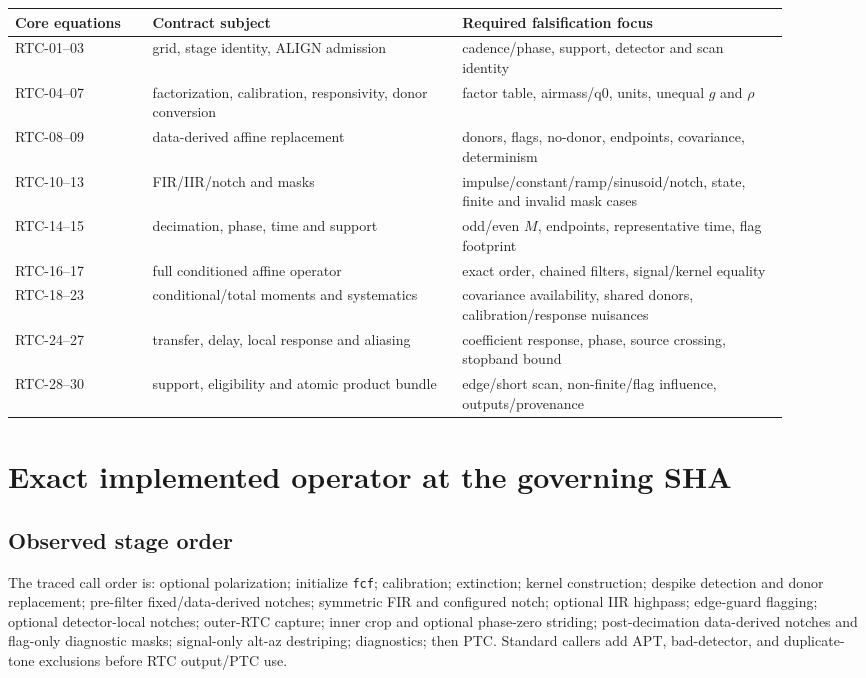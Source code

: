 \documentclass[11pt]{article}
\newcommand{\code}[1]{\nolinkurl{#1}}
\begin{document}
\begin{longtable}{@{}L{0.16\linewidth}L{0.36\linewidth}L{0.38\linewidth}@{}}
\toprule
Core equations & Contract subject & Required falsification focus \\
\midrule
\endhead
RTC-01--03 & grid, stage identity, ALIGN admission & cadence/phase, support, detector and scan identity \\
RTC-04--07 & factorization, calibration, responsivity, donor conversion & factor table, airmass/q0, units, unequal $g$ and $\rho$ \\
RTC-08--09 & data-derived affine replacement & donors, flags, no-donor, endpoints, covariance, determinism \\
RTC-10--13 & FIR/IIR/notch and masks & impulse/constant/ramp/sinusoid/notch, state, finite and invalid mask cases \\
RTC-14--15 & decimation, phase, time and support & odd/even $M$, endpoints, representative time, flag footprint \\
RTC-16--17 & full conditioned affine operator & exact order, chained filters, signal/kernel equality \\
RTC-18--23 & conditional/total moments and systematics & covariance availability, shared donors, calibration/response nuisances \\
RTC-24--27 & transfer, delay, local response and aliasing & coefficient response, phase, source crossing, stopband bound \\
RTC-28--30 & support, eligibility and atomic product bundle & edge/short scan, non-finite/flag influence, outputs/provenance \\
\bottomrule
\end{longtable}

\section{Exact implemented operator at the governing SHA}

\subsection{Observed stage order}

The traced call order is: optional polarization; initialize \code{fcf};
calibration; extinction; kernel construction; despike detection and donor
replacement; pre-filter fixed/data-derived notches; symmetric FIR and
configured notch; optional IIR highpass; edge-guard flagging; optional
detector-local notches; outer-RTC capture; inner crop and optional phase-zero
striding; post-decimation data-derived notches and flag-only diagnostic masks;
signal-only alt-az destriping; diagnostics; then PTC.  Standard callers add APT,
bad-detector, and duplicate-tone exclusions before RTC output/PTC use.
\end{document}
